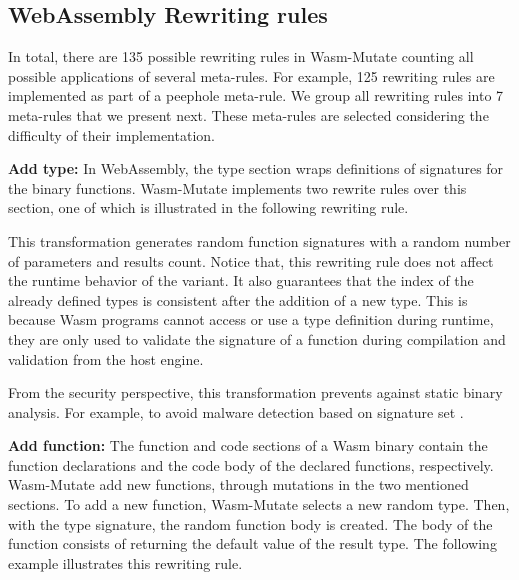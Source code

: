 \documentclass[sigplan,screen]{acmart}
\newcommand*\badge[1]{ \colorbox{red}{\color{white}#1}}
\newcommand{\tool}{{\sc Wasm-Mutate}\xspace}
\newcommand{\todo}[1]{%
\refstepcounter{todo}
\noindent\textbf{\badge{TODO}} {\color{red}#1}
\addcontentsline{td}{todo}
{\color{red}\thesection.\thetodo\xspace #1}}
\begin{document}
\subsection{WebAssembly Rewriting rules}

% 

In total, there are 135 possible rewriting rules in \tool counting all possible applications of several meta-rules.
For example, 125 rewriting rules are implemented as part of a peephole meta-rule.
We group all rewriting rules into 7 meta-rules that we present next.
These meta-rules are selected considering the difficulty of their implementation.

\textbf{Add type:}
In WebAssembly, the type section wraps definitions of signatures for the binary functions.
\tool implements two rewrite rules over this section, one of which is illustrated in the following rewriting rule. 



This transformation generates random function signatures with a random number of parameters and results count.
Notice that, this rewriting rule does not affect the runtime behavior of the  variant.
It also guarantees that the index of the already defined types is consistent after the addition of a new type. This is because Wasm programs cannot access or use a type definition during runtime, they are only used to validate the signature of a function during compilation and validation from the host engine.

From the security perspective, this transformation prevents against static binary analysis. 
For example, to avoid malware detection based on signature set \cite{CABRERAARTEAGA2023103296}.

\textbf{Add function:} The function and code sections of a Wasm binary contain the function  declarations and the code body of the declared functions, respectively.
\tool add new functions, through mutations in the two mentioned sections.
To add a new function, \tool selects a new random type.
Then, with the type signature, the random function body is created.
The body of the function consists of returning the default value of the result type.
The following example illustrates this rewriting rule.
\end{document}
